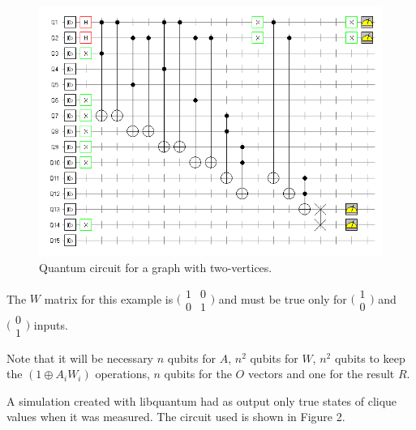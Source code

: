 \documentclass[a4paper,12pt]{article}
\begin{document}
\begin{figure}[!ht]
	\label{fig:qcircuit}
	\centering
	\includegraphics[width=1\textwidth]{qclique}
	\caption{Quantum circuit for a graph with two-vertices.}
\end{figure}

The $W$ matrix for this example is $\bigl(\begin{smallmatrix}
1&0 \\ 0&1 \end{smallmatrix} \bigr)$ and must be true only for $\bigl(\begin{smallmatrix} 1\\0 \end{smallmatrix} \bigr)$ and $\bigl(\begin{smallmatrix} 0\\1 \end{smallmatrix} \bigr)$ inputs.

Note that it will be necessary $n$ qubits for $A$, $n^2$ qubits for $W$, $n^2$ qubits to keep the $(1 \oplus A_i W_i)$ operations, $n$ qubits for the $O$ vectors and one for the result $R$.

A simulation created with libquantum had as output only true states of clique values when it was measured. The circuit used is shown in Figure 2.
\end{document}
